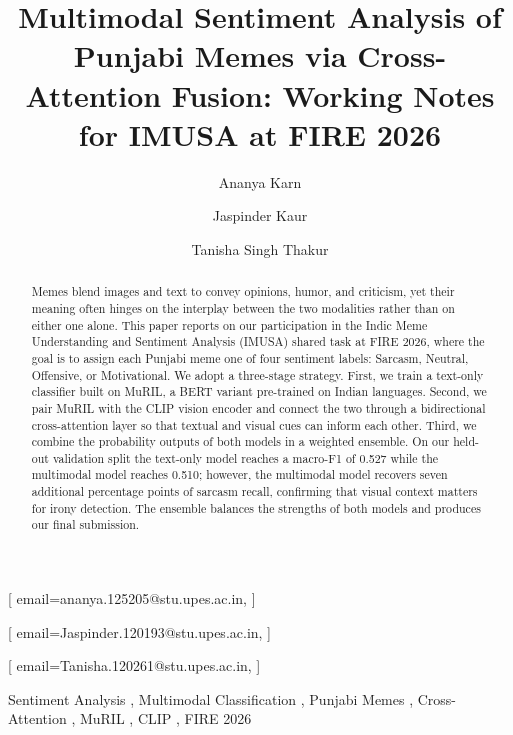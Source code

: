 \documentclass[
]{ceurart}
\begin{document}


\title{Multimodal Sentiment Analysis of Punjabi Memes via Cross-Attention Fusion: Working Notes for IMUSA at FIRE 2026}

\author[1]{Ananya Karn}[%
email=ananya.125205@stu.upes.ac.in,
]
\address[1]{School of Computer Science, UPES, Dehradun, India}

\author[2]{Jaspinder Kaur}[%
email=Jaspinder.120193@stu.upes.ac.in,
]
\address[2]{School of Computer Science, UPES, Dehradun, India}

\author[3]{Tanisha Singh Thakur}[%
email=Tanisha.120261@stu.upes.ac.in,
]
\address[3]{School of Computer Science, UPES, Dehradun, India}


\begin{abstract}
Memes blend images and text to convey opinions, humor, and criticism, yet their meaning often hinges on the interplay between the two modalities rather than on either one alone. This paper reports on our participation in the Indic Meme Understanding and Sentiment Analysis (IMUSA) shared task at FIRE 2026, where the goal is to assign each Punjabi meme one of four sentiment labels: Sarcasm, Neutral, Offensive, or Motivational. We adopt a three-stage strategy. First, we train a text-only classifier built on MuRIL, a BERT variant pre-trained on Indian languages. Second, we pair MuRIL with the CLIP vision encoder and connect the two through a bidirectional cross-attention layer so that textual and visual cues can inform each other. Third, we combine the probability outputs of both models in a weighted ensemble. On our held-out validation split the text-only model reaches a macro-F1 of 0.527 while the multimodal model reaches 0.510; however, the multimodal model recovers seven additional percentage points of sarcasm recall, confirming that visual context matters for irony detection. The ensemble balances the strengths of both models and produces our final submission.
\end{abstract}

\begin{keywords}
  Sentiment Analysis \sep
  Multimodal Classification \sep
  Punjabi Memes \sep
  Cross-Attention \sep
  MuRIL \sep
  CLIP \sep
  FIRE 2026
\end{keywords}
\end{document}
